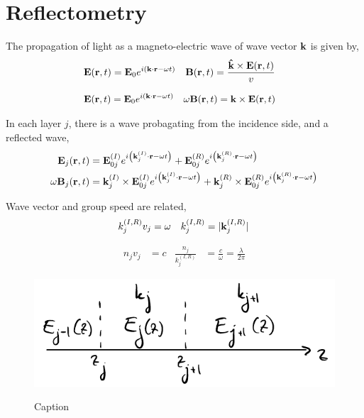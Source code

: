 
\section{Reflectometry} %
\label{sec:reflectometry}

The propagation of light as a magneto-electric wave of wave vector $\vb{k}$ is given by,
\begin{align*}
	\vb{E}\pqty{\vb{r},t} &= \vb{E}_{0}e^{i\pqty{\vb{k}\cdot\vb{r} - \omega t}} & \vb{B}\pqty{\vb{r},t} &= \frac{\vu{k}\times\vb{E}\pqty{\vb{r},t}}{v}
\end{align*}

\begin{align*}
	\vb{E}\pqty{\vb{r},t} &= \vb{E}_{0}e^{i\pqty{\vb{k}\cdot\vb{r} - \omega t}} & \omega \vb{B}\pqty{\vb{r},t} &= \vb{k}\times\vb{E}\pqty{\vb{r},t}
\end{align*}

In each layer $j$, there is a wave probagating from the incidence side, and a reflected wave,
\begin{align*}
	\vb{E}_j\pqty{\vb{r},t} &= 
		\vb{E}_{0j}^{(I)}e^{i\pqty{\vb{k}_j^{(I)}\cdot\vb{r} - \omega t}} + 
		\vb{E}_{0j}^{(R)}e^{i\pqty{\vb{k}_j^{(R)}\cdot\vb{r} - \omega t}} \\
	\omega\vb{B}_j\pqty{\vb{r},t} &= 
		\vb{k}_j^{(I)}\times\vb{E}_{0j}^{(I)}e^{i\pqty{\vb{k}_j^{(I)}\cdot\vb{r} - \omega t}} + 
		\vb{k}_j^{(R)}\times\vb{E}_{0j}^{(R)}e^{i\pqty{\vb{k}_j^{(R)}\cdot\vb{r} - \omega t}}
\end{align*}

Wave vector and group speed are related,
\begin{align*}
	k_j^{(I,R)}v_j &= \omega & k_j^{(I,R)} = \abs*{\vb{k}_j^{(I,R)}}
\end{align*}

\begin{align*}
	n_j v_j &= c & \frac{n_j}{k_j^{(I,R)}} &= \frac{c}{\omega} = \frac{\lambda}{2\pi}
\end{align*}


\begin{figure}
\begin{center}
    {\includegraphics{Figures/SpaceDiscretion.pdf}
    }
\caption{
Caption
}
\label{fig:1}
\end{center}
\end{figure}

